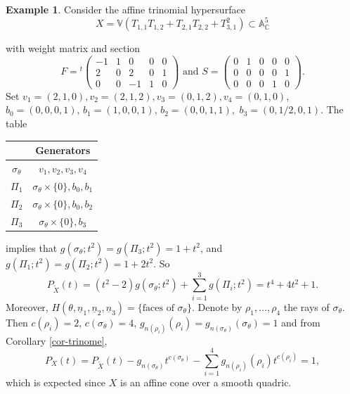 \documentclass[11pt, reqno]{amsart}
\theoremstyle{plain}
\theoremstyle{definition}
\newtheorem{example}[theorem]{Example}
\theoremstyle{remark}
\begin{document}
\begin{example}
Consider the affine trinomial hypersurface
$$X =  \mathbb{V}(T_{1,1}T_{1,2} + T_{2,1} T_{2,2}+ T_{3,1}^{2})\subset \mathbb{A}_{\mathbb{C}}^{5}$$

with weight matrix and  section
$$F  =  {}^{t}\begin{pmatrix}
 -1 &   1 & 0 & 0 & 0 \\
 2 &  0 &  2 & 0& 1 \\
 0  &  0 &  -1& 1& 0    
\end{pmatrix} \text{ and } S  =  \begin{pmatrix}
 0 &   1 & 0 & 0 & 0 \\
 0 &  0 &  0 & 0& 1 \\
 0  &  0 &  0 & 1& 0    
\end{pmatrix}.$$
 Set 
$v_{1} =  (2,1, 0), v_{2} =  (2,1,2), v_{3} =  (0,1,2), v_{4} =  (0,1,0)$, 
$b_{0} =  (0,0,0,1), \, b_{1} =  (1,0,0,1),\, b_{2} =  (0,0,1,1),\,\, b_{3} =  (0, 1/2, 0,1).$  The table
\\

\begin{center}
 \begin{tabular}{ |c|c|}
 \hline
  &  Generators \\ 
 \hline\hline
 $\sigma_{\theta}$ & $v_{1}, v_{2}, v_{3}, v_{4}$ \\ 
 \hline
  $\Pi_{1}$ & $\sigma_{\theta}\times\{0\}, b_{0} , b_{1}$  \\   
 \hline
  $\Pi_{2}$ & $\sigma_{\theta}\times\{0\}, b_{0}, b_{2}$  \\ 
 \hline
  $\Pi_{3}$ & $\sigma_{\theta}\times\{0\} , b_{3}$  \\
 \hline
\end{tabular}
\end{center}
 implies that
$g(\sigma_{\theta};t^{2}) = g(\Pi_{3}; t^2) =  1 + t^{2}$, and  $g(\Pi_{1}; t^{2}) = g(\Pi_{2}; t^{2}) =  1 + 2t^{2}$. So
$$ P_{\widetilde{X}}(t)  =  (t^{2} - 2) g(\sigma_{\theta};t^{2}) +  \sum_{i =  1}^{3}g(\Pi_{i}; t^{2})  =  t^{4} + 4 t^{2}  + 1.$$
Moreover,
$H(\theta, \underline{n}_{1}, \underline{n}_{2},\underline{n}_{3}) =  \{\text{faces of } \sigma_{\theta}\}.$
Denote by $\rho_{1}, \ldots, \rho_{4}$ the rays of $\sigma_{\theta}$.
Then $c(\rho_{i})  = 2$, $c(\sigma_{\theta})  =  4$,
$g_{n(\rho_{i})}(\rho_{i}) =  g_{n(\sigma_{\theta})}(\sigma_{\theta})  =1 $  and from Corollary \ref{cor-trinome},
$$ P_{X}(t)  =  P_{\widetilde{X}}(t) -  g_{n(\sigma_{\theta})}t^{c(\sigma_{\theta})} - \sum_{i = 1}^{4}g_{n(\rho_{i})}(\rho_{i})t^{c(\rho_{i})} = 1,$$
which is expected since $X$ is an affine cone over a smooth quadric.
\end{example}
\end{document}
